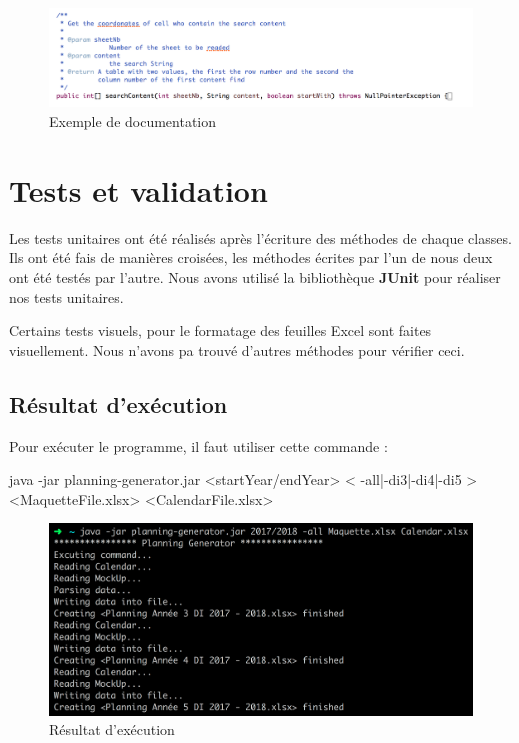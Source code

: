 \documentclass{polytech/polytech}
\begin{document}
	\begin{figure}
		\caption{Exemple de documentation}
		\includegraphics[width=\textwidth]{./img/documentation.png}
	\end{figure}

	\section{Tests et validation}

	Les tests unitaires ont été réalisés après l'écriture des méthodes de chaque classes.
	Ils ont été fais de manières croisées, les méthodes écrites par l'un de nous deux ont été testés par l'autre.
	Nous avons utilisé la bibliothèque \textbf{JUnit} pour réaliser nos tests unitaires.

	Certains tests visuels, pour le formatage des feuilles Excel sont faites visuellement.
	Nous n'avons pa trouvé d'autres méthodes pour vérifier ceci.

	\subsection{Résultat d'exécution}

	Pour exécuter le programme, il faut utiliser cette commande :

	\begin{latexsource}
	java -jar planning-generator.jar <startYear/endYear> < -all|-di3|-di4|-di5 > <MaquetteFile.xlsx> <CalendarFile.xlsx>
	\end{latexsource}

	\begin{figure}
		\caption{Résultat d'exécution}
		\includegraphics[width=15cm]{./img/excution_result2.png}
	\end{figure}
\end{document}
